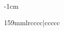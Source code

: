 \begin{table}[tbh]
\begin{adjustwidth}{-1cm}{}
\begin{tabulary}{159mm}{lrcccc|ccccc}
\bottomrule
\end{tabulary}
\end{adjustwidth}
\end{table}
